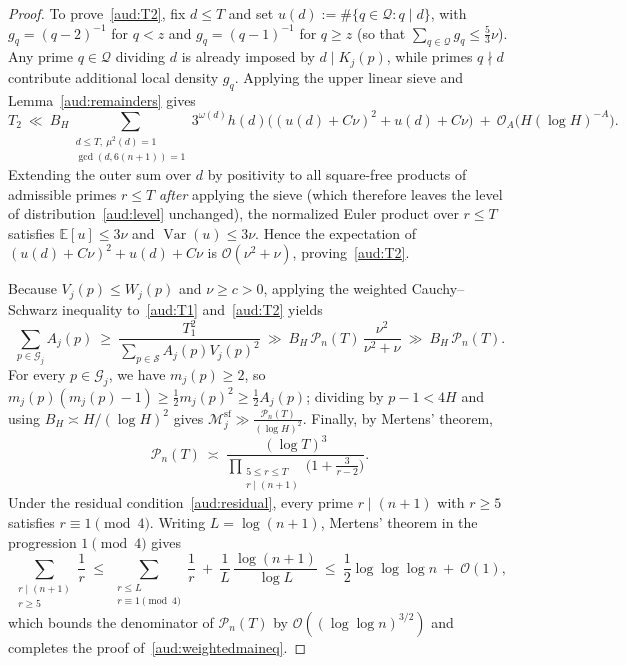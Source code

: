 \documentclass[11pt, a4paper]{article}
\theoremstyle{plain}
\theoremstyle{definition}
\newcommand{\Ebb}{\mathbb{E}}
\newcommand{\sfm}{\mathrm{sf}}
\begin{document}
\begin{proof}
To prove~\eqref{aud:T2}, fix $d\le T$ and set $u(d):=\#\{q\in\mathcal{Q}:q\mid d\}$, with $g_q=(q-2)^{-1}$ for $q<z$ and $g_q=(q-1)^{-1}$ for $q\ge z$ (so that $\sum_{q\in\mathcal{Q}}g_q\le\frac53\nu$). Any prime $q\in\mathcal{Q}$ dividing $d$ is already imposed by $d\mid K_j(p)$, while primes $q\nmid d$ contribute additional local density $g_q$. Applying the upper linear sieve and Lemma~\ref{aud:remainders} gives
\begin{equation}\label{aud:T2local}
T_2\ \ll\ B_H\sum_{\substack{d\le T,\ \mu^{2}(d)=1\\ \gcd(d,6(n+1))=1}}3^{\omega(d)}h(d)\Big((u(d)+C\nu)^{2}+u(d)+C\nu\Big)\ +\ \mathcal{O}_A\big(H(\log H)^{-A}\big).
\end{equation}
Extending the outer sum over $d$ by positivity to all square-free products of admissible primes $r\le T$ \emph{after} applying the sieve (which therefore leaves the level of distribution~\eqref{aud:level} unchanged), the normalized Euler product over $r\le T$ satisfies $\Ebb[u]\le 3\nu$ and $\operatorname{Var}(u)\le 3\nu$. Hence the expectation of $(u(d)+C\nu)^{2}+u(d)+C\nu$ is $\mathcal{O}(\nu^{2}+\nu)$, proving~\eqref{aud:T2}.

Because $V_j(p)\le W_j(p)$ and $\nu\ge c>0$, applying the weighted Cauchy--Schwarz inequality to~\eqref{aud:T1} and~\eqref{aud:T2} yields
\begin{equation}\label{aud:massA}
\sum_{p\in\mathcal{G}_j}A_j(p)\ \ge\ \frac{T_1^{2}}{\sum_{p\in\mathcal{S}}A_j(p)V_j(p)^{2}}\ \gg\ B_H\,\mathcal{P}_n(T)\,\frac{\nu^{2}}{\nu^{2}+\nu}\ \gg\ B_H\,\mathcal{P}_n(T).
\end{equation}
For every $p\in\mathcal{G}_j$, we have $m_j(p)\ge 2$, so $m_j(p)(m_j(p)-1)\ge\frac12 m_j(p)^{2}\ge\frac12 A_j(p)$; dividing by $p-1<4H$ and using $B_H\asymp H/(\log H)^{2}$ gives $\mathcal{M}_j^{\sfm}\gg\frac{\mathcal{P}_n(T)}{(\log H)^{2}}$. Finally, by Mertens' theorem,
\[
\mathcal{P}_n(T)\ \asymp\ \frac{(\log T)^{3}}{\prod_{\substack{5\le r\le T\\ r\mid(n+1)}}\big(1+\frac{3}{r-2}\big)}.
\]
Under the residual condition~\eqref{aud:residual}, every prime $r\mid(n+1)$ with $r\ge5$ satisfies $r\equiv1\pmod 4$. Writing $L=\log(n+1)$, Mertens' theorem in the progression $1\pmod 4$ gives
\[
\sum_{\substack{r\mid(n+1)\\ r\ge5}}\frac1r\ \le\ \sum_{\substack{r\le L\\ r\equiv1\pmod 4}}\frac1r\ +\ \frac{1}{L}\,\frac{\log(n+1)}{\log L}\ \le\ \frac12\log\log\log n\ +\ \mathcal{O}(1),
\]
which bounds the denominator of $\mathcal{P}_n(T)$ by $\mathcal{O}((\log\log n)^{3/2})$ and completes the proof of~\eqref{aud:weightedmaineq}.
\end{proof}
\end{document}

